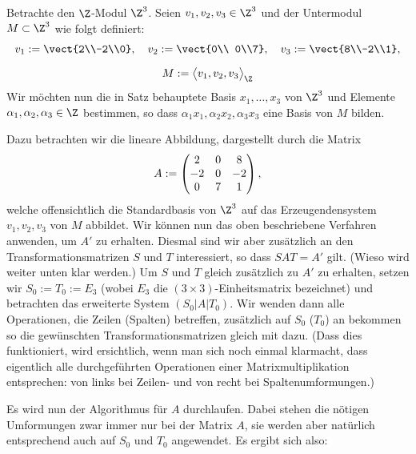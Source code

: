 \begin{thBeisp}
    Betrachte den $\Z$-Modul $\Z^3$. Seien $v_1,v_2,v_3 \in\Z^3$ und der
    Untermodul $M\subset\Z^3$ wie folgt definiert:
    \begin{gather*}
        v_1 := \vect{2\\-2\\0}, \quad 
        v_2 := \vect{0\\ 0\\7}, \quad
        v_3 := \vect{8\\-2\\1},
        \\[2mm]
        M := \Spann[\big]{v_1,v_2,v_3}_{\Z}
    \end{gather*}
    Wir möchten nun die in Satz %
    behauptete Basis $x_1,\ldots,x_3$ von $\Z^3$ und Elemente
    $\alpha_1,\alpha_2,\alpha_3\in\Z$ bestimmen, so dass 
    $\alpha_1 x_1,\alpha_2 x_2,\alpha_3 x_3$ eine Basis von $M$ bilden.
    
    Dazu betrachten wir die lineare Abbildung, dargestellt durch die Matrix
    \[ A := \begin{pmatrix}  2 & 0 &  8 \\
                    -2 & 0 & -2 \\
                     0 & 7 &  1   \end{pmatrix}  , \]
    welche offensichtlich die Standardbasis von $\Z^3$ auf das Erzeugendensystem
    $v_1,v_2,v_3$ von $M$ abbildet. Wir können nun das oben beschriebene
    Verfahren anwenden, um $A'$ zu erhalten. Diesmal sind wir aber zusätzlich an
    den Transformationsmatrizen $S$ und $T$ interessiert, so dass $S\!AT = A'$
    gilt. (Wieso wird weiter unten klar werden.) Um $S$ und $T$ gleich
    zusätzlich zu $A'$ zu erhalten, setzen wir $S_0:=T_0:=E_3$ (wobei $E_3$ die
    $(3\times3)$-Einheitsmatrix bezeichnet) und betrachten das erweiterte System
    $(S_0|A|T_0)$. Wir wenden dann alle Operationen, die Zeilen (Spalten)
    betreffen, zusätzlich auf $S_0$ ($T_0$) an bekommen so die gewünschten 
    Transformationsmatrizen gleich mit dazu.
    (Dass dies funktioniert, wird ersichtlich, wenn man sich noch einmal klarmacht,
    dass eigentlich alle durchgeführten Operationen einer Matrixmultiplikation
    entsprechen: von links bei Zeilen- und von recht bei Spaltenumformungen.)
    
    Es wird nun der Algorithmus für $A$ durchlaufen. Dabei stehen die nötigen
    Umformungen zwar immer nur bei der Matrix $A$, sie werden aber natürlich
    entsprechend auch auf $S_0$ und $T_0$ angewendet. Es ergibt sich also:
    

\end{thBeisp}
